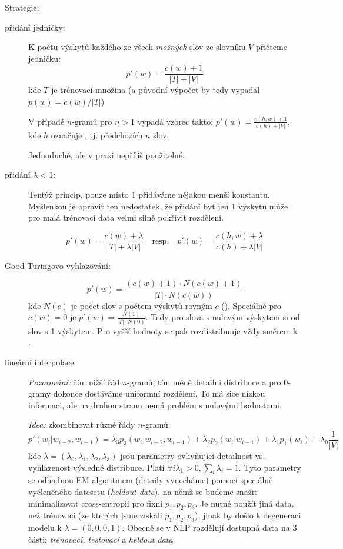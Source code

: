 \documentclass[11pt]{report} %
\numberwithin{equation}{section}
\begin{document}
Strategie:
\begin{description}
	
	
	\item[přidání jedničky:] K počtu výskytů každého ze všech \textit{možných} slov ze slovníku $V$ přičteme jedničku:
	$$p'(w) = \frac{c(w) + 1}{|T| + |V|}$$
	kde $T$ je trénovací množina (a původní výpočet by tedy vypadal $p(w) = c(w)/|T|$)
	
	V případě $n$-gramů pro $n > 1$ vypadá vzorec takto: $p'(w) = \frac{c(h,w) + 1}{c(h) + |V|}$, kde $h$ označuje , tj. předchozích $n$ slov.
	
	Jednoduché, ale v praxi nepříliš použitelné.
	
	\item[přidání $\lambda < 1$:] Tentýž princip, pouze místo 1 přidáváme nějakou menší konstantu. Myšlenkou je opravit ten nedostatek, že přidání byť jen 1 výskytu může pro malá trénovací data velmi silně pokřivit rozdělení.
	
	$$p'(w) = \frac{c(w) + \lambda}{|T| + \lambda|V|} \quad \text{resp.} \quad p'(w) = \frac{c(h,w) + \lambda}{c(h) + \lambda|V|}$$
	
	\item[Good-Turingovo vyhlazování:] 
	$$p'(w) = \frac{(c(w)+1) \cdot N(c(w) + 1)}{|T| \cdot N(c(w))}$$
	kde $N(c)$ je počet slov s počtem výskytů rovným $c$ (). Speciálně pro $c(w) = 0$ je $p'(w) = \frac{N(1)}{|T|\cdot N(0)}$. Tedy pro slova s nulovým výskytem si  od slov s 1 výskytem. Pro vyšší hodnoty se pak  rozdistribuuje vždy směrem k .
	
	\item[lineární interpolace:] \textit{Pozorování:} čím nižší řád $n$-gramů, tím méně detailní distribuce a pro $0$-gramy dokonce dostáváme uniformní rozdělení. To má sice nízkou informaci, ale na druhou stranu nemá problém s nulovými hodnotami. 
	
	\textit{Idea:} zkombinovat různé řády $n$-gramů:
	$$p'(w_i|w_{i-2}, w_{i-1}) = \lambda_3 p_3(w_i|w_{i-2}, w_{i-1}) + \lambda_2 p_2(w_{i}| w_{i-1}) + \lambda_1 p_1(w_i) + \lambda_0 \frac{1}{|V|}$$
	kde $\lambda = (\lambda_0, \lambda_1, \lambda_2, \lambda_3)$ jsou parametry ovlivňující detailnost vs. vyhlazenost výsledné distribuce. Platí $\forall i \lambda_1 > 0, \sum_i \lambda_i = 1$. Tyto parametry se odhadnou EM algoritmem (detaily vynecháme) pomocí speciálně vyčleněného datesetu (\textit{heldout data}), na němž se budeme snažit minimalizovat cross-entropii pro fixní $p_1, p_2, p_3$. Je nutné použít jiná data, než trénovací (ze kterých jsme získali $p_1, p_2, p_3$), jinak by došlo k degeneraci modelu k $\lambda = (0,0,0,1)$. Obecně se v NLP rozdělují dostupná data na 3 části: \textit{trénovací, testovací} a \textit{heldout data}.
	
\end{description}
\end{document}
